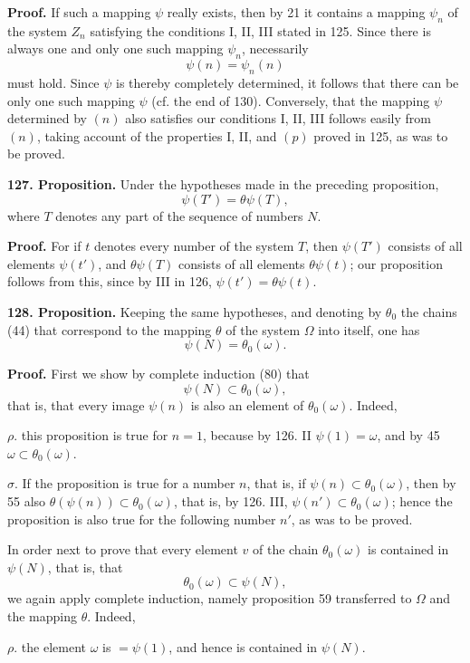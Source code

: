 \documentclass[11pt]{article}
\newcommand{\partof}{\mathrel{\subset}}
\begin{document}
\noindent\textbf{Proof.} If such a mapping $\psi$ really exists, then by 21 it contains a mapping $\psi_n$ of the system $Z_n$ satisfying the conditions I, II, III stated in 125. Since there is always one and only one such mapping $\psi_n$, necessarily
\[
\psi(n)=\psi_n(n) \tag{n}
\]
must hold. Since $\psi$ is thereby completely determined, it follows that there can be only one such mapping $\psi$ (cf. the end of 130). Conversely, that the mapping $\psi$ determined by $(n)$ also satisfies our conditions I, II, III follows easily from $(n)$, taking account of the properties I, II, and $(p)$ proved in 125, as was to be proved.

\noindent\textbf{127. Proposition.} Under the hypotheses made in the preceding proposition,
\[
\psi(T')=\theta\psi(T),
\]
where $T$ denotes any part of the sequence of numbers $N$.

\noindent\textbf{Proof.} For if $t$ denotes every number of the system $T$, then $\psi(T')$ consists of all elements $\psi(t')$, and $\theta\psi(T)$ consists of all elements $\theta\psi(t)$; our proposition follows from this, since by III in 126, $\psi(t')=\theta\psi(t)$.

\noindent\textbf{128. Proposition.} Keeping the same hypotheses, and denoting by $\theta_0$ the chains (44) that correspond to the mapping $\theta$ of the system $\Omega$ into itself, one has
\[
\psi(N)=\theta_0(\omega).
\]

\noindent\textbf{Proof.} First we show by complete induction (80) that
\[
\psi(N)\partof\theta_0(\omega),
\]
that is, that every image $\psi(n)$ is also an element of $\theta_0(\omega)$. Indeed,

\noindent $\rho.$ this proposition is true for $n=1$, because by 126. II $\psi(1)=\omega$, and by 45 $\omega\partof\theta_0(\omega)$.

\noindent $\sigma.$ If the proposition is true for a number $n$, that is, if $\psi(n)\partof\theta_0(\omega)$, then by 55 also $\theta(\psi(n))\partof\theta_0(\omega)$, that is, by 126. III, $\psi(n')\partof\theta_0(\omega)$; hence the proposition is also true for the following number $n'$, as was to be proved.

In order next to prove that every element $v$ of the chain $\theta_0(\omega)$ is contained in $\psi(N)$, that is, that
\[
\theta_0(\omega)\partof\psi(N),
\]
we again apply complete induction, namely proposition 59 transferred to $\Omega$ and the mapping $\theta$. Indeed,

\noindent $\rho.$ the element $\omega$ is $=\psi(1)$, and hence is contained in $\psi(N)$.
\end{document}
